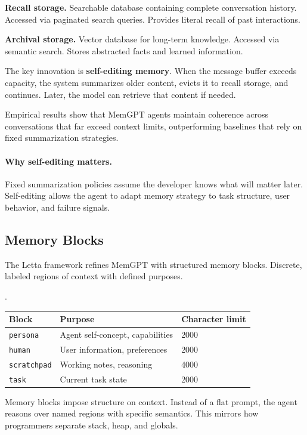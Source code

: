 \textbf{Recall storage.} Searchable database containing complete conversation history. Accessed via paginated search queries. Provides literal recall of past interactions.

\textbf{Archival storage.} Vector database for long-term knowledge. Accessed via semantic search. Stores abstracted facts and learned information.

The key innovation is \textbf{self-editing memory}. When the message buffer exceeds capacity, the system summarizes older content, evicts it to recall storage, and continues. Later, the model can retrieve that content if needed.

Empirical results show that MemGPT agents maintain coherence across conversations that far exceed context limits, outperforming baselines that rely on fixed summarization strategies.

\paragraph{Why self-editing matters.}
Fixed summarization policies assume the developer knows what will matter later. Self-editing allows the agent to adapt memory strategy to task structure, user behavior, and failure signals.

\subsection{Memory Blocks}

The Letta framework \cite{letta2024memgpt} refines MemGPT with structured memory blocks. Discrete, labeled regions of context with defined purposes.

\begin{center}.
\begin{tabular}{lll}
\toprule
Block & Purpose & Character limit \\
\midrule
\texttt{persona} & Agent self-concept, capabilities & 2000 \\
\texttt{human} & User information, preferences & 2000 \\
\texttt{scratchpad} & Working notes, reasoning & 4000 \\
\texttt{task} & Current task state & 2000 \\
\bottomrule
\end{tabular}
\end{center}

Memory blocks impose structure on context. Instead of a flat prompt, the agent reasons over named regions with specific semantics. This mirrors how programmers separate stack, heap, and globals.

